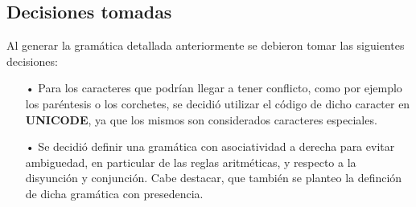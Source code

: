 \subsection{Decisiones tomadas}

Al generar la gram\'atica detallada anteriormente se debieron tomar las siguientes decisiones:

\begin{itemize}

\item[•] Para los caracteres que podr\'ian llegar a tener conflicto, como por ejemplo los par\'entesis o los corchetes, se decidi\'o utilizar el c\'odigo de dicho caracter en \textbf{UNICODE}, ya que los mismos son considerados caracteres especiales.

\item[•]Se decidi\'o definir una gram\'atica con asociatividad a derecha para evitar ambiguedad, en particular de las reglas aritm\'eticas, y respecto a la disyunci\'on y conjunci\'on. Cabe destacar, que tambi\'en se planteo la definci\'on de dicha gram\'atica con presedencia.


\end{itemize}

